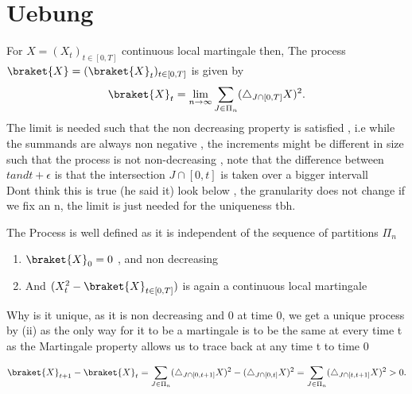 \chapter{Uebung}
\begin{definition}
  For $X = (X_t)_{t \in  [0,T]}$   continuous local martingale  then, The process $\braket{X} = (\braket{X}_t)_{t \in  [0,T]}$ is given by 
  \begin{align*}
    \braket{X}_t = \lim_{n \to  \infty} \sum_{J \in \Pi_{n}} (\triangle_{J \cap [0,T]} X)^2 
  .\end{align*}
  The limit is needed such that the non decreasing property is satisfied , i.e while the summands are always non negative ,
  the increments might be different in size such that the process is not non-decreasing , note that the difference between $t and t+\epsilon $ is that the intersection $J \cap [0,t]$ is taken over a bigger intervall \\
  Dont think this is true (he said it) look below , the granularity does not change if we fix an n, the limit is just needed for the uniqueness tbh.
 \end{definition}
\begin{remark}
 The Process is well defined as it is independent of the sequence of partitions $\Pi_n$ 
 \begin{enumerate}
   \item $\braket{X}_0 = 0$ , and non decreasing 
   \item And $(X_t^2 - \braket{X}_{t \in  [0,T]})$ is again a continuous local martingale 
 \end{enumerate}
 Why is it unique, as it is non decreasing and 0 at time 0, we get a unique process by (ii) as the only way for it to be a martingale is to be the same 
 at every time t as the Martingale property allows us to trace back at any time t to time 0  \\[1ex]
\end{remark}
\begin{align*}
  \braket{X}_{t+1} - \braket{X}_t = \sum_{J \in  \Pi_n} (\triangle_{J \cap [0,t+1]} X)^2 - (\triangle_{J \cap [0,t]} X)^2 =  \sum_{J \in  \Pi_n} (\triangle_{J \cap [t,t+1]} X)^2 > 0 
.\end{align*}
